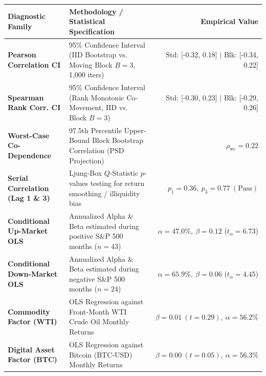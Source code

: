\documentclass[10pt,a4paper]{article}
\begin{document}
\begin{tcolorbox}[colback=white, colframe=primary, title=\textbf{\small\strut Appendix A: Extended Statistical, Bootstrap \& Factor Diagnostics}, fonttitle=\sffamily\bfseries\small, arc=5pt, boxrule=0.8pt, toptitle=4pt, bottomtitle=4pt, left=6pt, right=6pt, top=4pt, bottom=4pt, colbacktitle=primary]
\renewcommand{\arraystretch}{1.25}
\scriptsize
\begin{tabularx}{\textwidth}{l X r}
\toprule
\textbf{\textcolor{primary}{Diagnostic Family}} & \textbf{\textcolor{primary}{Methodology / Statistical Specification}} & \textbf{\textcolor{primary}{Empirical Value}} \\
\midrule
\textbf{Pearson Correlation CI} & 95\% Confidence Interval (IID Bootstrap vs. Moving Block $B=3$, 1,000 iters) & Std: [-0.32, 0.18] $\vert$ Blk: [-0.34, 0.22] \\
\rowcolor{cardbg} \textbf{Spearman Rank Corr. CI} & 95\% Confidence Interval (Rank Monotonic Co-Movement, IID vs. Block $B=3$) & Std: [-0.30, 0.23] $\vert$ Blk: [-0.29, 0.26] \\
\textbf{Worst-Case Co-Dependence} & 97.5th Percentile Upper-Bound Block Bootstrap Correlation (PSD Projection) & $\rho_{\text{wc}} = 0.22$ \\
\rowcolor{cardbg} \textbf{Serial Correlation (Lag 1 \& 3)} & Ljung-Box $Q$-Statistic $p$-values testing for return smoothing / illiquidity bias & $p_1=0.36,\ p_3=0.77\ (\text{Pass})$ \\
\textbf{Conditional Up-Market OLS} & Annualized Alpha \& Beta estimated during positive S\&P 500 months ($n=43$) & $\alpha=47.0\%,\ \beta=0.12$ ($t_\alpha=6.73$) \\
\rowcolor{cardbg} \textbf{Conditional Down-Market OLS} & Annualized Alpha \& Beta estimated during negative S\&P 500 months ($n=24$) & $\alpha=65.9\%,\ \beta=0.06$ ($t_\alpha=4.45$) \\
\textbf{Commodity Factor (WTI)} & OLS Regression against Front-Month WTI Crude Oil Monthly Returns & $\beta=0.01\ (t=0.29),\ \alpha=56.2\%$ \\
\rowcolor{cardbg} \textbf{Digital Asset Factor (BTC)} & OLS Regression against Bitcoin (BTC-USD) Monthly Returns & $\beta=0.00\ (t=0.05),\ \alpha=56.3\%$ \\
\bottomrule
\end{tabularx}
\end{tcolorbox}

\vspace{0.35em}
\end{document}
